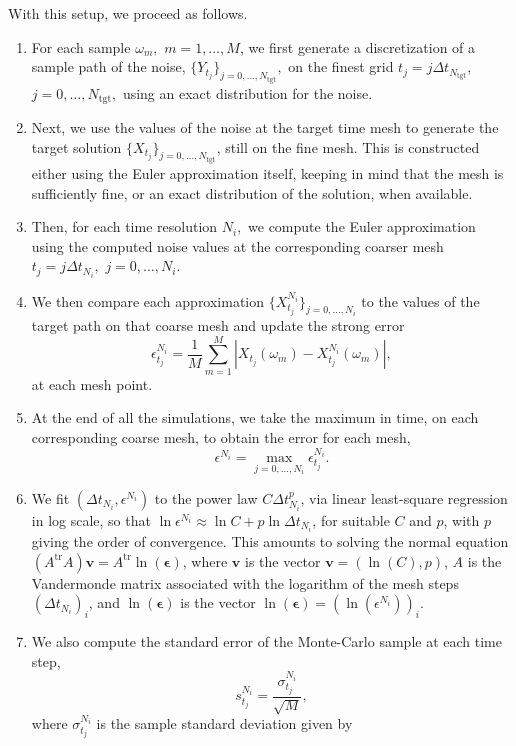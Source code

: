 \documentclass[reqno,12pt]{amsart}
\theoremstyle{plain} %
\theoremstyle{definition} %
\newcommand{\tr}{{\operatorname{tr}}}
\begin{document}
With this setup, we proceed as follows.
\begin{enumerate}
    \item For each sample $\omega_m,$ $m=1, \ldots, M$, we first generate a discretization of a sample path of the noise, $\{Y_{t_j}\}_{j=0, \ldots, N_{\mathrm{tgt}}},$ on the finest grid $t_j = j \Delta t_{N_{\textrm{tgt}}}$, $j = 0, \ldots, N_{\mathrm{tgt}},$ using an exact distribution for the noise.
    \item Next, we use the values of the noise at the target time mesh to generate the target solution $\{X_{t_j}\}_{j=0, \ldots, N_{\mathrm{tgt}}}$, still on the fine mesh. This is constructed either using the Euler approximation itself, keeping in mind that the mesh is sufficiently fine, or an exact distribution of the solution, when available.
    \item Then, for each time resolution $N_i,$ we compute the Euler approximation using the computed noise values at the corresponding coarser mesh $t_j = j\Delta t_{N_i},$ $j=0, \ldots, N_i.$
    \item We then compare each approximation $\{X_{t_j}^{N_i}\}_{j=0, \ldots, N_i}$ to the values of the target path on that coarse mesh and update the strong error
    \[
        \epsilon_{t_j}^{N_i} = \frac{1}{M}\sum_{m=1}^M \left|X_{t_j}(\omega_m) - X_{t_j}^{N_i}(\omega_m)\right|,
    \]
    at each mesh point.
    \item At the end of all the simulations, we take the maximum in time, on each corresponding coarse mesh, to obtain the error for each mesh,
    \[
        \epsilon^{N_i} = \max_{j=0, \ldots, N_i} \epsilon_{t_j}^{N_i}.
    \]
    \item We fit $(\Delta t_{N_i}, \epsilon^{N_i})$ to the power law $C\Delta t_{N_i}^p$, via linear least-square regression in log scale, so that $\ln \epsilon^{N_i} \approx \ln C + p \ln \Delta t_{N_i}$, for suitable $C$ and $p$, with $p$ giving the order of convergence. This amounts to solving the normal equation $(A^\tr A)\mathbf{v} = A^\tr\ln(\boldsymbol{\epsilon})$, where $\mathbf{v}$ is the vector $\mathbf{v} = (\ln(C), p)$, $A$ is the Vandermonde matrix associated with the logarithm of the mesh steps $(\Delta t_{N_i})_i$, and $\ln(\boldsymbol{\epsilon})$ is the vector $\ln(\boldsymbol{\epsilon}) = (\ln(\epsilon^{N_i}))_i$.
    \item We also compute the standard error of the Monte-Carlo sample at each time step,
    \[
        s_{t_j}^{N_i} = \frac{\sigma_{t_j}^{N_i}}{\sqrt{M}},
    \]
    where $\sigma_{t_j}^{N_i}$ is the sample standard deviation given by

\end{enumerate}
\end{document}
